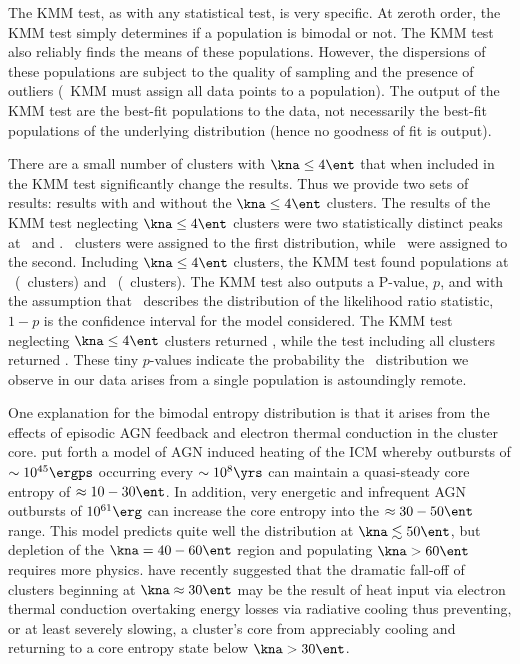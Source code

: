 \documentclass{emulateapj}
\begin{document}
The KMM test, as with any statistical test, is very specific. At
zeroth order, the KMM test simply determines if a population is
bimodal or not. The KMM test also reliably finds the means of these
populations. However, the dispersions of these populations are subject
to the quality of sampling and the presence of outliers (\eg\ KMM must
assign all data points to a population). The output of the KMM test
are the best-fit populations to the data, not necessarily the best-fit
populations of the underlying distribution (hence no goodness of fit
is output).


There are a small number of clusters with $\kna \le 4 \ent$ that when
included in the KMM test significantly change the results. Thus we
provide two sets of results: results with and without the $\kna \le 4
\ent$ clusters. The results of the KMM test neglecting $\kna \le 4
\ent$ clusters were two statistically distinct peaks at \kmma\ and
\kmmb. \kmmc\ clusters were assigned to the first distribution, while
\kmmd\ were assigned to the second. Including $\kna \le 4 \ent$
clusters, the KMM test found populations at \kmmf\ (\kmmh\ clusters)
and \kmmg\ (\kmmi\ clusters). The KMM test also outputs a P-value,
$p$, and with the assumption that \chisq\ describes the distribution
of the likelihood ratio statistic, $1-p$ is the confidence interval
for the model considered. The KMM test neglecting $\kna \le 4 \ent$
clusters returned \kmme, while the test including all clusters
returned \kmmj. These tiny $p$-values indicate the probability the
\kna\ distribution we observe in our data arises from a single
population is astoundingly remote.

One explanation for the bimodal entropy distribution is that it arises
from the effects of episodic AGN feedback and electron thermal
conduction in the cluster core. \cite{agnframework} put forth a model
of AGN induced heating of the ICM whereby outbursts of $\sim 10^{45}
\ergps$ occurring every $\sim 10^8 \yrs$ can maintain a quasi-steady
core entropy of $\approx 10-30 \ent$. In addition, very energetic and
infrequent AGN outbursts of $10^{61} \erg$ can increase the core
entropy into the $\approx 30-50 \ent$ range. This model predicts quite
well the distribution at $\kna \lesssim 50 \ent$, but depletion of the
$\kna = 40-60 \ent$ region and populating $\kna > 60 \ent$ requires
more physics. \cite{conduction} have recently suggested that the
dramatic fall-off of clusters beginning at $\kna \approx 30 \ent$ may
be the result of heat input via electron thermal conduction overtaking
energy losses via radiative cooling thus preventing, or at least
severely slowing, a cluster's core from appreciably cooling and
returning to a core entropy state below $\kna > 30 \ent$.
\end{document}
